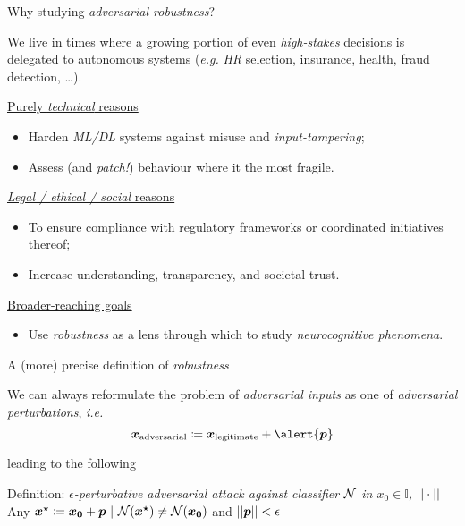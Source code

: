 \begin{frame}{ Why studying \textit{adversarial robustness}?}

    We live in times where a growing portion of even \textit{high-stakes} \alert{decisions} is \alert{delegated} to autonomous systems (\textit{e.g.} \textit{HR} selection, insurance, health, fraud detection, \etc\dots).

    \underline{Purely \textit{technical} reasons}
    \begin{itemize}
        \item Harden \textit{ML/DL} systems against \alert{misuse} and \textit{input-tampering};
        \item Assess (and \textit{\alert{patch}!}) behaviour where it the most fragile.
    \end{itemize}

    \underline{\textit{Legal / ethical / social} reasons}
    \begin{itemize}
        \item To ensure \alert{compliance} with regulatory frameworks or coordinated initiatives thereof;
        \item Increase understanding, transparency, and societal \alert{trust}.
    \end{itemize}

    \underline{Broader-reaching goals}
    \begin{itemize}
        \item Use \textit{robustness} as a lens through which to study \textit{\alert{neurocognitive} phenomena}.
    \end{itemize}
\end{frame}

\begin{frame}{ A (more) precise definition of \textit{robustness}}

    We can always reformulate the problem of \textit{adversarial inputs} as one of \textit{\alert{adversarial perturbations}}, \textit{i.e.}
    $$ \vec{x}_{\text{adversarial}} \coloneq  \vec{x}_{\text{legitimate}} + \alert{\vec{p}}$$

    leading to the following

    \begin{block}{Definition: \textit{\alert{$\epsilon$}-perturbative adversarial attack against classifier $\mathcal{N}$ in $x_0 \in \mathbb{I}$, \wrt $||\cdot||$}}
        Any $\bm{x^{\star}} \coloneq \bm{x_0} + \bm{p} \text{ | } \mathcal{N}(\bm{x^{\star}}) \neq \mathcal{N}(\bm{x_0})$ and $||\bm{p}|| < \epsilon$
    \end{block}
\end{frame}

